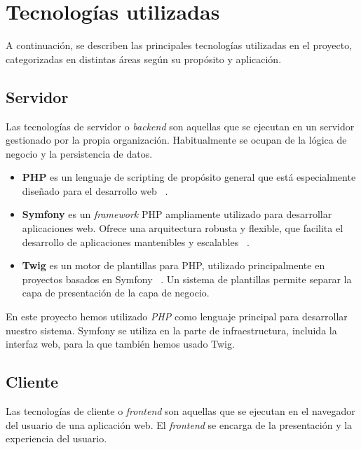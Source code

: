 \section{Tecnologías utilizadas}\label{sec:tecnologias_utilizadas}

A continuación, se describen las principales tecnologías utilizadas en el proyecto, categorizadas en distintas áreas
según su propósito y aplicación.

\subsection*{Servidor}

Las tecnologías de servidor o \textit{backend} son aquellas que se ejecutan en un servidor gestionado por la propia
organización.
Habitualmente se ocupan de la lógica de negocio y la persistencia de datos.

\begin{itemize}
    \item \textbf{PHP} es un lenguaje de scripting de propósito general que está especialmente diseñado para el
    desarrollo web ~\cite{url_php}.
    \item \textbf{Symfony} es un \textit{framework} PHP ampliamente utilizado para desarrollar aplicaciones web.
    Ofrece una arquitectura robusta y flexible, que facilita el desarrollo de aplicaciones mantenibles y escalables
    ~\cite{url_symfony}.
    \item \textbf{Twig} es un motor de plantillas para PHP, utilizado principalmente en proyectos basados en
    Symfony ~\cite{url_twig}.
    Un sistema de plantillas permite separar la capa de presentación de la capa de negocio.
\end{itemize}

En este proyecto hemos utilizado \textit{PHP} como lenguaje principal para desarrollar nuestro sistema.
Symfony se utiliza en la parte de infraestructura, incluida la interfaz web, para la que también hemos usado Twig.

\subsection*{Cliente}

Las tecnologías de cliente o \textit{frontend} son aquellas que se ejecutan en el navegador del usuario de una
aplicación web.
El \textit{frontend} se encarga de la presentación y la experiencia del usuario.


